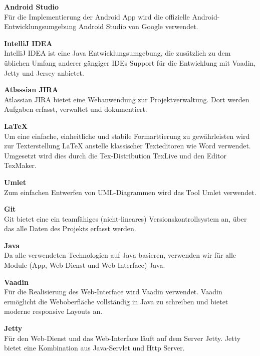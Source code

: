 \begin{description}
\item \textbf{\gls{Android} Studio} \hfill \\
Für die Implementierung der \gls{Android} \gls{App} wird die offizielle \gls{Android}-Entwicklungsumgebung \gls{Android} Studio von Google verwendet.

\item \textbf{IntelliJ IDEA} \hfill \\
IntelliJ IDEA ist eine Java Entwicklungsumgebung, die zusätzlich zu dem üblichen Umfang anderer gängiger IDEs Support für die Entwicklung mit Vaadin, Jetty und Jersey anbietet.

\item \textbf{Atlassian JIRA} \hfill \\
Atlassian JIRA bietet eine Webanwendung zur Projektverwaltung. Dort werden Aufgaben erfasst, verwaltet und dokumentiert.

\item \textbf{LaTeX} \hfill \\
Um eine einfache, einheitliche und stabile Formarttierung zu gewährleisten wird zur Texterstellung LaTeX  anstelle klassischer Texteditoren wie Word verwendet. Umgesetzt wird dies durch die Tex-Distribution TexLive und den Editor TexMaker.

\item \textbf{Umlet} \hfill \\
Zum einfachen Entwerfen von UML-Diagrammen wird das Tool Umlet verwendet.

\item \textbf{Git} \hfill \\
Git bietet eine ein teamfähiges (nicht-lineares) Versionskontrollsystem an, über das alle Daten des Projekts erfasst werden.

\item \textbf{Java} \hfill \\
Da alle verwendeten Technologien auf Java basieren, verwenden wir für alle Module (\gls{App}, \gls{Web-Dienst} und \gls{Web-Interface}) Java.

\item \textbf{Vaadin} \hfill \\
Für die Realisierung des \gls{Web-Interface} wird Vaadin verwendet. Vaadin ermöglicht die Weboberfläche vollständig in Java zu schreiben und bietet moderne responsive Layouts an.

\item \textbf{Jetty} \hfill \\
Für den \gls{Web-Dienst} und das \gls{Web-Interface} läuft auf dem Server Jetty. Jetty bietet eine Kombination aus \gls{Java-Servlet} und Http Server.


\end{description}
